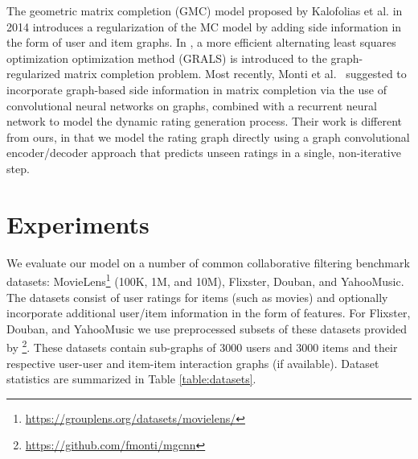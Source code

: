 \documentclass[twoside]{article}
\begin{document}
The geometric matrix completion (GMC) model proposed by Kalofolias et al. in 2014 \cite{kalofolias2014matrix} introduces a regularization of the MC model by adding side information in the form of user and item graphs. In \cite{GralsRaoNIPS2015}, a more efficient  alternating least squares optimization optimization method (GRALS) is introduced to the graph-regularized matrix completion problem. Most recently, Monti et al.~\cite{2017_Monti_arXiv} suggested to incorporate graph-based side information in matrix completion via the use of convolutional neural networks on graphs, combined with a recurrent neural network to model the dynamic rating generation process. Their work is different from ours, in that we model the rating graph directly using a graph convolutional encoder/decoder approach that predicts unseen ratings in a single, non-iterative step.




 

\section{Experiments}
\label{sec:exp}
We evaluate our model on a number of common collaborative filtering benchmark datasets: MovieLens\footnote{\url{https://grouplens.org/datasets/movielens/}} (100K, 1M, and 10M), Flixster, Douban, and YahooMusic. The datasets consist of user ratings for items (such as movies) and optionally incorporate additional user/item information in the form of features. For Flixster, Douban, and YahooMusic we use preprocessed subsets of these datasets provided by \cite{2017_Monti_arXiv}\footnote{\url{https://github.com/fmonti/mgcnn}}. These datasets contain sub-graphs of 3000 users and 3000 items and their respective user-user and item-item interaction graphs (if available). Dataset statistics are summarized in Table \ref{table:datasets}. 
\end{document}
